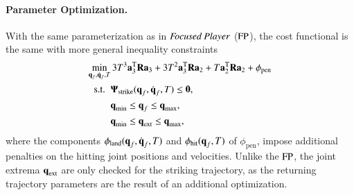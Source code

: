 %
%
%
%
\paragraph{\textbf{Parameter Optimization}.} With the same parameterization as in $\emph{Focused Player}$ ($\mathrm{FP}$), the cost functional is the same with more general inequality constraints
%
\begin{align}
\min_{\boldsymbol{\mathrm{q}}_f,\dot{\boldsymbol{\mathrm{q}}}_f, T} & \,3T^3 \boldsymbol{\mathrm{a}}_3^{\mathrm{T}}\boldsymbol{\mathrm{R}}\boldsymbol{\mathrm{a}}_3 + 3T^2 \boldsymbol{\mathrm{a}}_3^{\mathrm{T}}\boldsymbol{\mathrm{R}}\boldsymbol{\mathrm{a}}_2 +
T\boldsymbol{\mathrm{a}}_2^{\mathrm{T}}\boldsymbol{\mathrm{R}}\boldsymbol{\mathrm{a}}_2 + \phi_{\mathrm{pen}} \label{costFnc4} \\
\textrm{s.t. \ }
& \boldsymbol{\mathrm{\Psi}}_{\mathrm{strike}}(\boldsymbol{\mathrm{q}}_f,\dot{\boldsymbol{\mathrm{q}}}_f,T) \leq \boldsymbol{\mathrm{0}}, \\
& \boldsymbol{\mathrm{q}}_{\mathrm{min}} \leq \boldsymbol{\mathrm{q}}_f \leq \boldsymbol{\mathrm{q}}_{\mathrm{max}}, \\
& \boldsymbol{\mathrm{q}}_{\mathrm{min}} \leq \boldsymbol{\mathrm{q}}_{\mathrm{ext}} \leq \boldsymbol{\mathrm{q}}_{\mathrm{max}},
\end{align}
%
\noindent where the components $\phi_{\mathrm{land}}(\boldsymbol{\mathrm{q}}_f,\dot{\boldsymbol{\mathrm{q}}}_f, T)$ and $\phi_{\mathrm{hit}}(\boldsymbol{\mathrm{q}}_f, T)$ of $\phi_{\mathrm{pen}}$, impose additional penalties on the hitting joint positions and velocities. Unlike the $\mathrm{FP}$, the joint extrema $\boldsymbol{\mathrm{q}}_{\mathrm{ext}}$ are only checked for the striking trajectory, as the returning trajectory parameters are the result of an additional optimization. 
%
